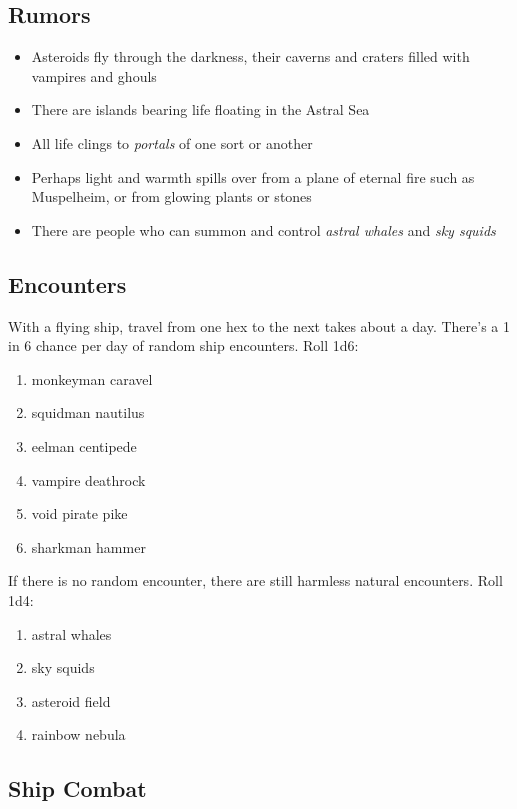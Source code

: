 \documentclass[11pt]{bxart}
\begin{document}
\subsection{Rumors}

\begin{itemize}
\item Asteroids fly through the darkness, their caverns and craters filled with vampires and ghouls
\item There are islands bearing life floating in the Astral Sea
\item All life clings to \textit{portals} of one sort or another
\item Perhaps light and warmth spills over from a plane of eternal fire such as Muspelheim, or from glowing plants or stones
\item There are people who can summon and control \textit{astral whales} and \textit{sky squids}
\end{itemize}

\subsection{Encounters}

With a flying ship, travel from one hex to the next takes about a day. There's a 1 in 6 chance per day of random ship encounters. Roll 1d6:

\begin{enumerate}
\item monkeyman caravel
\item squidman nautilus
\item eelman centipede
\item vampire deathrock 
\item void pirate pike
\item sharkman hammer
\end{enumerate}

If there is no random encounter, there are still harmless natural encounters. Roll 1d4:

\begin{enumerate}
\item astral whales
\item sky squids
\item asteroid field
\item rainbow nebula
\end{enumerate}

\newpage

\subsection{Ship Combat}
\end{document}
